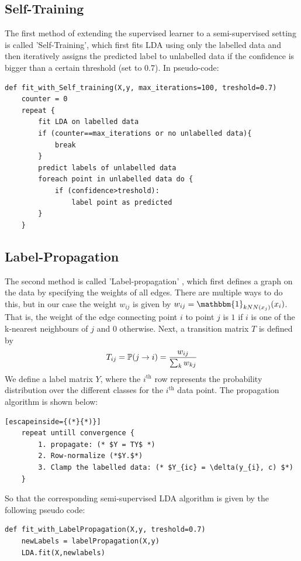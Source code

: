 \documentclass [a4paper] {report}
\begin{document}
	\subsection*{Self-Training}
	The first method of extending the supervised learner to a semi-supervised setting is called 'Self-Training', which first fits LDA using only the labelled data and then iteratively assigns the predicted label to unlabelled data if the confidence is bigger than a certain threshold (set to 0.7). In pseudo-code:
	
	\begin{lstlisting}
def fit_with_Self_training(X,y, max_iterations=100, treshold=0.7)
	counter = 0
	repeat {
		fit LDA on labelled data
		if (counter==max_iterations or no unlabelled data){
			break
		}
		predict labels of unlabelled data
		foreach point in unlabelled data do {
			if (confidence>treshold):
				label point as predicted
		}		
	}
	\end{lstlisting}
	\subsection*{Label-Propagation}
	The second method is called 'Label-propagation' \citep{propagation}, which first defines a graph on the data by specifying the weights of all edges. There are multiple ways to do this, but in our case the weight $w_{ij}$ is given by $w_{ij} = \mathbbm{1}_{kNN(x_{j})}(x_{i})$. That is, the weight of the edge connecting point $i$ to point $j$ is $1$ if $i$ is one of the k-nearest neighbours of $j$ and $0$ otherwise. Next, a transition matrix $T$ is defined by 
	$$T_{ij} = \mathbb{P}(j \to i) = {w_{ij} \over \sum_{k} w_{kj} } $$
	We define a label matrix $Y$, where the $i^{\text{th}}$ row represents the probability distribution over the different classes for the $i^{\text{th}}$ data point. The propagation algorithm is shown below:
	\begin{lstlisting}[escapeinside={(*}{*)}]
	repeat untill convergence {
		1. propagate: (* $Y = TY$ *)
		2. Row-normalize (*$Y.$*)
		3. Clamp the labelled data: (* $Y_{ic} = \delta(y_{i}, c) $*)	
	}
	\end{lstlisting}
	So that the corresponding semi-supervised LDA algorithm is given by the following pseudo code:
	\begin{lstlisting}
def fit_with_LabelPropagation(X,y, treshold=0.7)
	newLabels = labelPropagation(X,y)
	LDA.fit(X,newlabels)
	\end{lstlisting}
	
\end{document}
